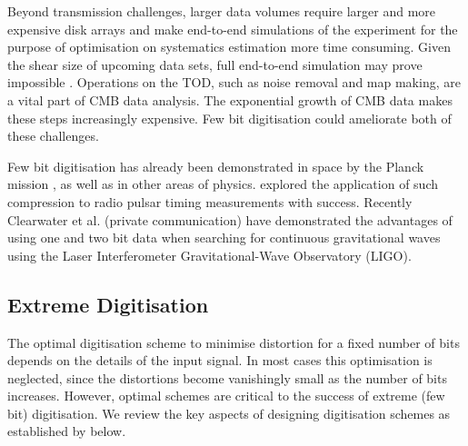 \documentclass[apj]{emulateapj}
\begin{document}


Beyond transmission challenges, larger data volumes require larger and more expensive disk arrays and make end-to-end simulations of the experiment for the purpose of optimisation on systematics estimation more time consuming. Given the shear size of upcoming data sets, full end-to-end simulation may prove impossible \citep{s4sciencebook}. Operations on the TOD, such as noise removal and map making, are a vital part of CMB data analysis. The exponential growth of CMB data makes these steps increasingly expensive. Few bit digitisation could ameliorate both of these challenges.



Few bit digitisation has already been demonstrated in space by the Planck mission \citep{maris2003}, as well as in other areas of physics. \cite{jenet1998} explored the application of such compression to radio pulsar timing measurements with success. Recently Clearwater et al. (private communication) have demonstrated the advantages of using one and two bit data when searching for continuous gravitational waves using the Laser Interferometer Gravitational-Wave Observatory (LIGO).


\subsection{Extreme Digitisation}
\label{subsec:extremedigitisation}

The optimal digitisation scheme to minimise distortion for a fixed number of bits depends on the details of the input signal. In most cases this optimisation is neglected, since the distortions become vanishingly small as the number of bits increases. However, optimal schemes are critical to the success of extreme (few bit) digitisation. We review the key aspects of designing digitisation schemes as established by \cite{max1960} below.
\end{document}
